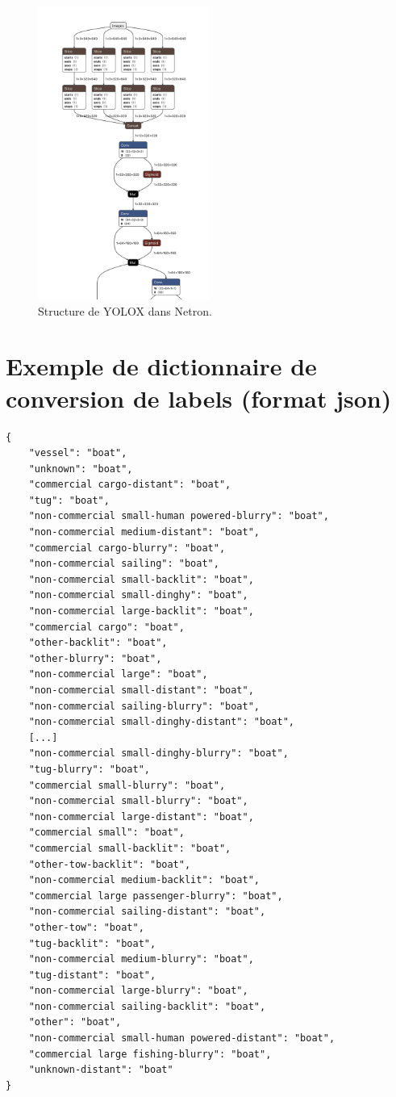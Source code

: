 \begin{figure}[h]
    \label{netron}
    \centering
    \includegraphics[width=0.5\textwidth]{./img/netron.png}
    \caption{Structure de YOLOX dans Netron.}
\end{figure}

\pagebreak

\chapter{Exemple de dictionnaire de conversion de labels (format json)}

\begin{verbatim}
{
    "vessel": "boat",
    "unknown": "boat",
    "commercial cargo-distant": "boat",
    "tug": "boat",
    "non-commercial small-human powered-blurry": "boat",
    "non-commercial medium-distant": "boat",
    "commercial cargo-blurry": "boat",
    "non-commercial sailing": "boat",
    "non-commercial small-backlit": "boat",
    "non-commercial small-dinghy": "boat",
    "non-commercial large-backlit": "boat",
    "commercial cargo": "boat",
    "other-backlit": "boat",
    "other-blurry": "boat",
    "non-commercial large": "boat",
    "non-commercial small-distant": "boat",
    "non-commercial sailing-blurry": "boat",
    "non-commercial small-dinghy-distant": "boat",
    [...]
    "non-commercial small-dinghy-blurry": "boat",
    "tug-blurry": "boat",
    "commercial small-blurry": "boat",
    "non-commercial small-blurry": "boat",
    "non-commercial large-distant": "boat",
    "commercial small": "boat",
    "commercial small-backlit": "boat",
    "other-tow-backlit": "boat",
    "non-commercial medium-backlit": "boat",
    "commercial large passenger-blurry": "boat",
    "non-commercial sailing-distant": "boat",
    "other-tow": "boat",
    "tug-backlit": "boat",
    "non-commercial medium-blurry": "boat",
    "tug-distant": "boat",
    "non-commercial large-blurry": "boat",
    "non-commercial sailing-backlit": "boat",
    "other": "boat",
    "non-commercial small-human powered-distant": "boat",
    "commercial large fishing-blurry": "boat",
    "unknown-distant": "boat"
}
\end{verbatim}
\label{ex_dictionnaire_conversion}

